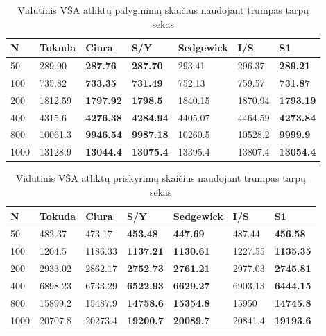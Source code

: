 \documentclass{VUMIFInfKursinis}
\begin{document}
\begin{table}[H]
  \caption{Vidutinis VŠA atliktų palyginimų skaičius naudojant trumpas tarpų sekas}
  \label{tss_small_comparisons}
  \begin{tabular}{|l|l|l|l|l|l|l|}
  \hline
  N    & Tokuda  & Ciura            & S/Y              & Sedgewick & I/S     & S1               \\ \hline
  50   & 289.90  & \textbf{287.76}  & \textbf{287.70}  & 293.41    & 296.37  & \textbf{289.21}  \\ \hline
  100  & 735.82  & \textbf{733.35}  & \textbf{731.49}  & 752.13    & 759.57  & \textbf{731.87}  \\ \hline
  200  & 1812.59 & \textbf{1797.92} & \textbf{1798.5}  & 1840.15   & 1870.94 & \textbf{1793.19} \\ \hline
  400  & 4315.6  & \textbf{4276.38} & \textbf{4284.94} & 4405.07   & 4464.59 & \textbf{4273.84} \\ \hline
  800  & 10061.3 & \textbf{9946.54} & \textbf{9987.18} & 10260.5   & 10528.2 & \textbf{9999.9}  \\ \hline
  1000 & 13128.9 & \textbf{13044.4} & \textbf{13075.4} & 13395.4   & 13807.4 & \textbf{13054.4} \\ \hline
  \end{tabular}
  \end{table}

\begin{table}[H]
  \caption{Vidutinis VŠA atliktų priskyrimų skaičius naudojant trumpas tarpų sekas}
  \label{tss_small_assignments}
  \begin{tabular}{|l|l|l|l|l|l|l|}
  \hline
  N    & Tokuda  & Ciura   & S/Y              & Sedgewick        & I/S     & S1               \\ \hline
  50   & 482.37  & 473.17  & \textbf{453.48}  & \textbf{447.69}  & 487.44  & \textbf{456.58}  \\ \hline
  100  & 1204.5  & 1186.33 & \textbf{1137.21} & \textbf{1130.61} & 1227.55 & \textbf{1135.35} \\ \hline
  200  & 2933.02 & 2862.17 & \textbf{2752.73} & \textbf{2761.21} & 2977.03 & \textbf{2745.81} \\ \hline
  400  & 6898.23 & 6733.29 & \textbf{6522.93} & \textbf{6629.27} & 6903.13 & \textbf{6444.15} \\ \hline
  800  & 15899.2 & 15487.9 & \textbf{14758.6} & \textbf{15354.8} & 15950   & \textbf{14745.8} \\ \hline
  1000 & 20707.8 & 20273.4 & \textbf{19200.7} & \textbf{20089.7} & 20841.4 & \textbf{19193.6} \\ \hline
  \end{tabular}
  \end{table}
\end{document}
